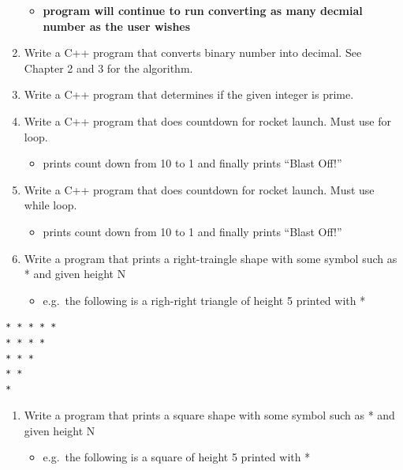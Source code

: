 \documentclass[11pt]{article}
\providecommand{\tightlist}{%
      \setlength{\itemsep}{0pt}\setlength{\parskip}{0pt}}
\begin{document}
\begin{enumerate}
  \begin{itemize}
  \tightlist
  \item
    \textbf{program will continue to run converting as many decmial
    number as the user wishes}
  \end{itemize}
\item
  Write a C++ program that converts binary number into decimal. See
  Chapter 2 and 3 for the algorithm.
\item
  Write a C++ program that determines if the given integer is prime.
\item
  Write a C++ program that does countdown for rocket launch. Must use
  for loop.

  \begin{itemize}
  \tightlist
  \item
    prints count down from 10 to 1 and finally prints ``Blast Off!''
  \end{itemize}
\item
  Write a C++ program that does countdown for rocket launch. Must use
  while loop.

  \begin{itemize}
  \tightlist
  \item
    prints count down from 10 to 1 and finally prints ``Blast Off!''
  \end{itemize}
\item
  Write a program that prints a right-traingle shape with some symbol
  such as * and given height N

  \begin{itemize}
  \tightlist
  \item
    e.g.~the following is a righ-right triangle of height 5 printed with
    *
  \end{itemize}
\end{enumerate}

\begin{verbatim}
* * * * *
* * * *
* * * 
* *  
* 
\end{verbatim}

\begin{enumerate}
\def\labelenumi{\arabic{enumi}.}
\setcounter{enumi}{13}
\tightlist
\item
  Write a program that prints a square shape with some symbol such as *
  and given height N

  \begin{itemize}
  \tightlist
  \item
    e.g.~the following is a square of height 5 printed with *
  \end{itemize}
\end{enumerate}
\end{document}
